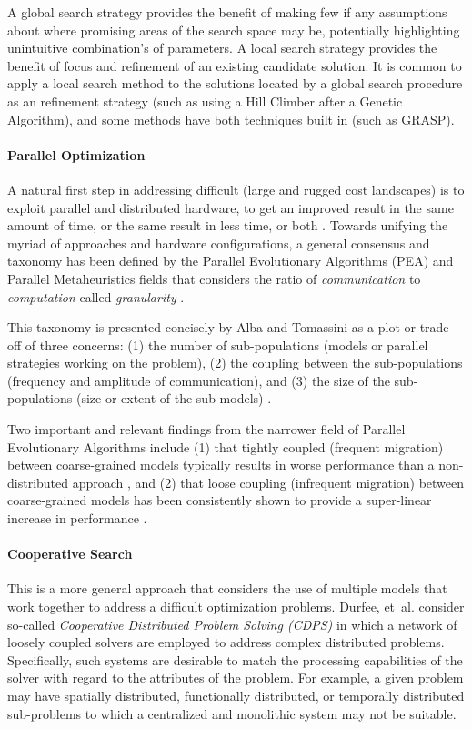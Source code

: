A global search strategy provides the benefit of making few if any assumptions about where promising areas of the search space may be, potentially highlighting unintuitive combination's of parameters. A local search strategy provides the benefit of focus and refinement of an existing candidate solution. It is common to apply a local search method to the solutions located by a global search procedure as an refinement strategy (such as using a Hill Climber after a Genetic Algorithm), and some methods have both techniques built in (such as GRASP).
	
\paragraph{Parallel Optimization}
A natural first step in addressing difficult (large and rugged cost landscapes) is to exploit parallel and distributed hardware, to get an improved result in the same amount of time, or the same result in less time, or both \cite{Crainic2005}. Towards unifying the myriad of approaches and hardware configurations, a general consensus and taxonomy has been defined by the Parallel Evolutionary Algorithms (PEA) and Parallel Metaheuristics fields that considers the ratio of \emph{communication} to \emph{computation} called \emph{granularity} \cite{Cantu-Paz2000, Alba2005a}. 

This taxonomy is presented concisely by Alba and Tomassini as a plot or trade-off of three concerns: (1) the number of sub-populations (models or parallel strategies working on the problem), (2) the coupling between the sub-populations (frequency and amplitude of communication), and (3) the size of the sub-populations (size or extent of the sub-models) \cite{Alba2002}. 

Two important and relevant findings from the narrower field of Parallel Evolutionary Algorithms include (1) that tightly coupled (frequent migration) between coarse-grained models typically results in worse performance than a non-distributed approach \cite{Alba2000}, and (2) that loose coupling (infrequent migration) between coarse-grained models has been consistently shown to provide a super-linear increase in performance \cite{Alba2002a, Belding1995, Cantu-Paz2000}.
	
\paragraph{Cooperative Search}
This is a more general approach that considers the use of multiple models that work together to address a difficult optimization problems. Durfee, et~al. consider so-called \emph{Cooperative Distributed Problem Solving (CDPS)} in which a network of loosely coupled solvers are employed to address complex distributed problems. Specifically, such systems are desirable to match the processing capabilities of the solver with regard to the attributes of the problem. For example, a given problem may have spatially distributed, functionally distributed, or temporally distributed sub-problems to which a centralized and monolithic system may not be suitable. 


